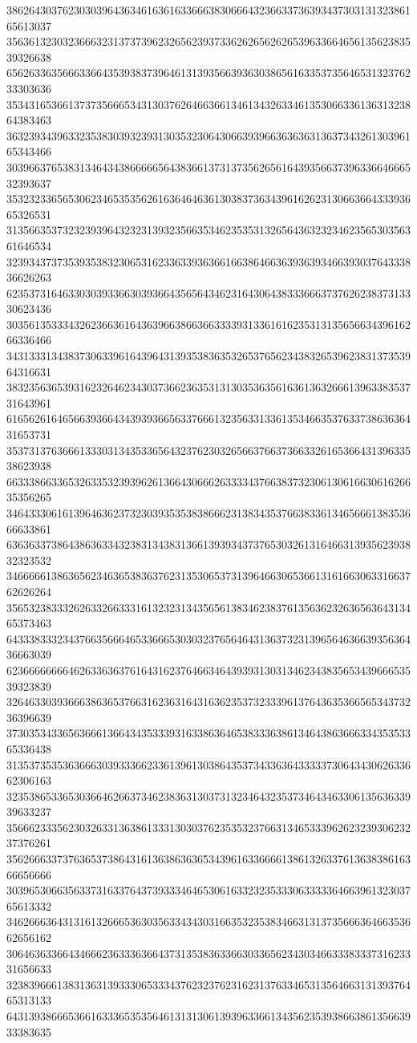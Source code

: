 38626430376230303964363461636163366638306664323663373639343730313132386165613037
35636132303236663231373739623265623937336262656262653963366465613562383539326638
65626336356663366435393837396461313935663936303865616335373564653132376233303636
35343165366137373566653431303762646636613461343263346135306633613631323864383463
36323934396332353830393239313035323064306639396636363631363734326130396165343466
30396637653831346434386666656438366137313735626561643935663739633664666532393637
35323233656530623465353562616364646361303837363439616262313066366433393665326531
31356635373232393964323231393235663534623535313265643632323462356530356361646534
32393437373539353832306531623363393636616638646636393639346639303764333836626263
62353731646330303933663039366435656434623164306438333666373762623837313330623436
30356135333432623663616436396638663663333931336161623531313565663439616266336466
34313331343837306339616439643139353836353265376562343832653962383137353964316631
38323563653931623264623430373662363531313035363561636136326661396338353731643961
61656261646566393664343939366563376661323563313361353466353763373863636431653731
35373137636661333031343533656432376230326566376637366332616536643139633538623938
66333866336532633532393962613664306662633334376638373230613061663061626635356265
34643330616139646362373230393535383866623138343537663833613465666138353666633861
63636337386438636334323831343831366139393437376530326131646631393562393832323532
34666661386365623463653836376231353065373139646630653661316166306331663762626264
35653238333262633266333161323231343565613834623837613563623263656364313465373463
64333833323437663566646533666530303237656464313637323139656463663935636436663039
62366666666462633636376164316237646634643939313031346234383565343966653539323839
32646330393666386365376631623631643163623537323339613764363536656534373236396639
37303534336563666136643435333931633863646538333638613464386366633435353365336438
31353735353636663039333662336139613038643537343363643333373064343062633662306163
32353865336530366462663734623836313037313234643235373464346330613563633939633237
35666233356230326331363861333130303762353532376631346533396262323930623237376261
35626663373763653738643161363863636534396163366661386132633761363838616366656666
30396530663563373163376437393334646530616332323533306333336466396132303765613332
34626663643131613266653630356334343031663532353834663131373566636466353662656162
30646363366434666236333636643731353836336630336562343034663338333731623331656633
32383966613831363139333065333437623237623162313763346531356466313139376465313133
64313938666536616333653535646131313061393963366134356235393866386135663933383635
